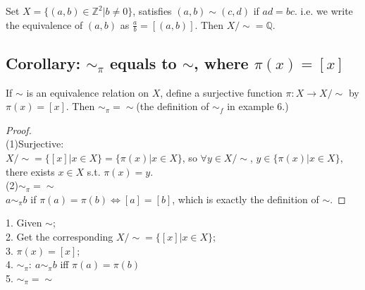 \documentclass[11pt]{elegantbook}
\begin{document}
\begin{example}
    Set $X=\{(a,b)\in \mathbb{Z}^2|b\neq 0 \}$, satisfies $(a,b)\sim(c,d)$ if $ad=bc$. i.e. we write the equivalence of $(a,b)$ as $\frac{a}{b}=[(a,b)]$. Then $X/\sim=\mathbb{Q}$.
\end{example}
\subsection{Corollary: $\sim_\pi$ equals to $\sim$, where $\pi(x) = [x]$}
\begin{corollary}
    If $\sim$ is an equivalence relation on $X$, define a surjective function $\pi: X \rightarrow	 X/\sim$ by $\pi(x) = [x]$. Then $\sim_\pi=\sim$(the definition of $\sim_f$ in example 6.)
\end{corollary}
\begin{proof}
\quad\\
(1)Surjective:\\
$X/\sim= \{[x]|x\in X \}=\{\pi(x)|x\in X \}$, so $\forall y\in X/\sim$, $y\in \{\pi(x)|x\in X \}$, there exists $x\in X$ s.t. $\pi(x)=y$.\\
(2)$\sim_\pi=\sim$\\
$a\sim_\pi b$ if $\pi(a)=\pi(b) \Leftrightarrow	[a]=[b]$, which is exactly the definition of $\sim$.
\end{proof}
1. Given $\sim$; \\
2. Get the corresponding $X/\sim=\{[x]|x\in X\}$; \\
3. $\pi(x) = [x]$; \\
4. $\sim_\pi:\ a\sim_\pi b$ iff $\pi(a)=\pi(b)$\\
5. $\sim_\pi=\sim$\\
\end{document}
